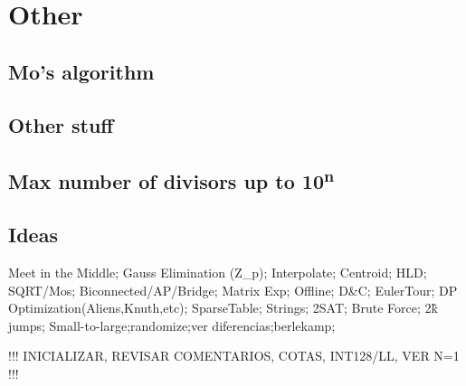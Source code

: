 \section{Other}

\subsection{Mo's algorithm}

\subsection{Other stuff}

\subsection{Max number of divisors up to 10\textsuperscript{n}}

\subsection{Ideas}
Meet in the Middle; Gauss Elimination (Z\_p); Interpolate; Centroid; HLD;
SQRT/Mos; Biconnected/AP/Bridge; Matrix Exp; Offline; D\&C; EulerTour;
DP Optimization(Aliens,Knuth,etc); SparseTable; Strings; 2SAT;
Brute Force; 2\^k jumps;
Small-to-large;randomize;ver diferencias;berlekamp;

!!! INICIALIZAR, REVISAR COMENTARIOS, COTAS, INT128/LL, VER N=1 !!!





